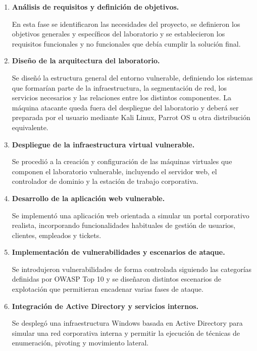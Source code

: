 \begin{enumerate}

    \item \textbf{Análisis de requisitos y definición de objetivos.}

    En esta fase se identificaron las necesidades del proyecto, se definieron los objetivos generales y específicos del laboratorio y se establecieron los requisitos funcionales y no funcionales que debía cumplir la solución final.

    \item \textbf{Diseño de la arquitectura del laboratorio.}

    Se diseñó la estructura general del entorno vulnerable, definiendo los sistemas que formarían parte de la infraestructura, la segmentación de red, los servicios necesarios y las relaciones entre los distintos componentes. La máquina atacante queda fuera del despliegue del laboratorio y deberá ser preparada por el usuario mediante Kali Linux, Parrot OS u otra distribución equivalente.

    \item \textbf{Despliegue de la infraestructura virtual vulnerable.}

    Se procedió a la creación y configuración de las máquinas virtuales que componen el laboratorio vulnerable, incluyendo el servidor web, el controlador de dominio y la estación de trabajo corporativa.

    \item \textbf{Desarrollo de la aplicación web vulnerable.}

    Se implementó una aplicación web orientada a simular un portal corporativo realista, incorporando funcionalidades habituales de gestión de usuarios, clientes, empleados y tickets.

    \item \textbf{Implementación de vulnerabilidades y escenarios de ataque.}

    Se introdujeron vulnerabilidades de forma controlada siguiendo las categorías definidas por OWASP Top 10 y se diseñaron distintos escenarios de explotación que permitieran encadenar varias fases de ataque.

    \item \textbf{Integración de Active Directory y servicios internos.}

    Se desplegó una infraestructura Windows basada en Active Directory para simular una red corporativa interna y permitir la ejecución de técnicas de enumeración, pivoting y movimiento lateral.


\end{enumerate}
